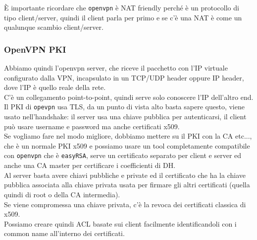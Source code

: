 \documentclass[12pt, oneside]{extbook} %
\begin{document}
È importante ricordare che \texttt{openvpn} è NAT friendly perché è un protocollo di tipo client/server, quindi il client parla per primo e se c'è una NAT è come un qualunque scambio client/server.

\subsubsection{OpenVPN PKI}
Abbiamo quindi l'openvpn server, che riceve il pacchetto con l'IP virtuale configurato dalla VPN, incapsulato in un TCP/UDP header oppure IP header, dove l'IP è quello reale della rete.
\\C'è un collegamento point-to-point, quindi serve solo conoscere l'IP dell'altro end.
\\Il PKI di \texttt{opevpn} usa TLS, da un punto di vista alto basta sapere questo, viene usato nell'handshake: il server usa una chiave pubblica per autenticarsi, il client può usare username e password ma anche certificati x509.
\\Se vogliamo fare nel modo migliore, dobbiamo mettere su il PKI con la CA etc..., che è un normale PKI x509 e possiamo usare un tool completamente compatibile con \texttt{openvpn} che è \texttt{easyRSA}, serve un certificato separato per client e server ed anche una CA master per certificare i coefficienti di DH.
\\Al server basta avere chiavi pubbliche e private ed il certificato che ha la chiave pubblica associata alla chiave privata usata per firmare gli altri certificati (quella quindi di root o della CA intermedia).
\\Se viene compromessa una chiave privata, c'è la revoca dei certificati classica di x509.
\\Possiamo creare quindi ACL basate sui client facilmente identificandoli con i common name all'interno dei certificati.
\end{document}
